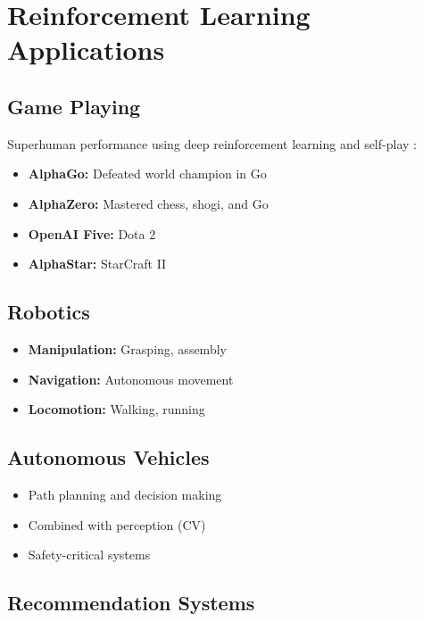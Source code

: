 
\section{Reinforcement Learning Applications }
\label{sec:rl-applications}

\subsection{Game Playing}

Superhuman performance using deep reinforcement learning and self-play \textcite{Silver2016,Prince2023}:
\begin{itemize}
    \item \textbf{AlphaGo:} Defeated world champion in Go
    \item \textbf{AlphaZero:} Mastered chess, shogi, and Go
    \item \textbf{OpenAI Five:} Dota 2
    \item \textbf{AlphaStar:} StarCraft II
\end{itemize}

\subsection{Robotics}

\begin{itemize}
    \item \textbf{Manipulation:} Grasping, assembly
    \item \textbf{Navigation:} Autonomous movement
    \item \textbf{Locomotion:} Walking, running
\end{itemize}

\subsection{Autonomous Vehicles}

\begin{itemize}
    \item Path planning and decision making
    \item Combined with perception (CV)
    \item Safety-critical systems
\end{itemize}

\subsection{Recommendation Systems}

